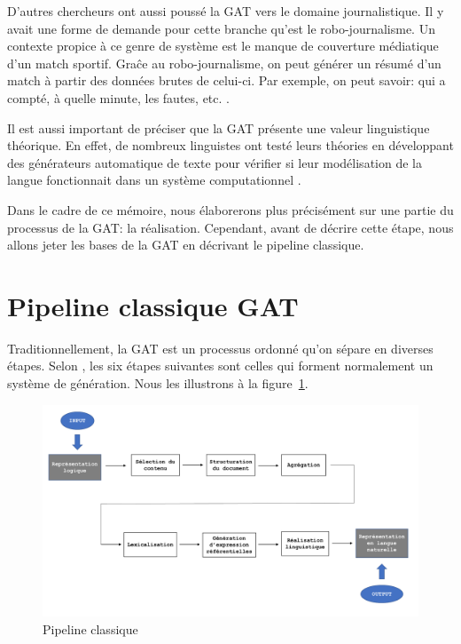 D'autres chercheurs ont aussi poussé la \ac{GAT} vers le domaine journalistique. Il y avait une forme de demande pour cette branche qu'est le robo-journalisme. Un contexte propice à ce genre de système est le manque de couverture médiatique d'un match sportif. Graĉe au robo-journalisme, on peut générer un résumé d'un match à partir des données brutes de celui-ci. Par exemple, on peut savoir: qui a compté, à quelle minute, les fautes, etc. \citep{W17-3513}.

Il est aussi important de préciser que la \ac{GAT} présente une valeur linguistique théorique. En effet, de nombreux linguistes ont testé leurs théories en développant des générateurs automatique de texte pour vérifier si leur modélisation de la langue fonctionnait dans un système computationnel \citep{DanlosPresentationmodelegeneration1983}. 

Dans le cadre de ce mémoire, nous élaborerons plus précisément sur une partie du processus de la \ac{GAT}: la réalisation. Cependant, avant de décrire cette étape, nous allons jeter les bases de la \ac{GAT} en décrivant le pipeline classique.


\section{Pipeline classique GAT} \label{ppc}

Traditionnellement, la \ac{GAT} est un processus ordonné qu'on sépare en diverses étapes. Selon \cite{ReiterBuildingNaturalLanguage2000}, les six étapes suivantes sont celles qui forment normalement un système de génération. Nous les illustrons à la figure~\ref{fig:Pipeline}.
\begin{figure}[htb] %
	\centering
	\includegraphics[width=1\textwidth, trim = {0cm 0cm 0cm 0cm},clip]{ch2/figs/pipeline.pdf}
	\caption{Pipeline classique}
	\label{fig:Pipeline}
\end{figure}

